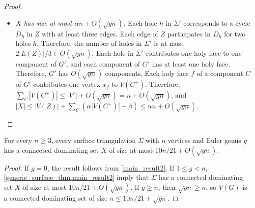 \documentclass{patmorin}
\begin{document}
\begin{proof}
\begin{itemize}
    Now consider the case when $v'$ and $w'$ lie in different components of $G'$.  Let $Q$ be any path in $G$ from $v$ to $w$. Partition the edges of $Q$ into maximal subpaths $Q_1,Q_2,\dots,Q_k$ such that each $Q_i$ corresponds to a path that is contained in some component $C_i$ of $G'$.  For each $i\in\{2,\ldots,k-1\}$, the subpath $Q_i$ has endpoints $v_i,w_i\in V(Z)\subseteq X$ and the component $C_i$ has corresponding vertices $v_i',w_i'\in Y_{C_i}$. The subpath $Q_1$ has endpoints $v_1:=v\in X$ corresponding to $v_1'\in V(C_1)$ and $w_1\in V(Z)\subseteq X$ corresponding to $w_1'\in Y_{C_1}$.  Since $v_1\in X$, $v_1'\in X_{C_1}\cup Y_{C_1}$.  The subpath $Q_k$ has endpoints $v_k\in V(Z)$ corresponding to $v_k'\in Y_{C_k}$ and $w_k:=w\in X$ corresponding to $w_k'\in V(C_k)$.  Since $w_k\in X$, $w_k'\in X_{C_k}\cup Y_{C_k}$. Thus, for each $i\in\{1,\ldots,k\}$, $H_{C_i}$ contains a path from $v_i'$ to $w_i'$, so $G_{C_i}\subseteq G[X]$ contains a path from $v_i$ to $w_i$.  Therefore, $G[X]$ contains a path from $v=v_1$ to $w=w_k$.

    \item \emph{$X$ has size at most $\alpha n + O(\sqrt{gn})$:} Each hole $h$ in $\Sigma'$ corresponds to a cycle $D_h$ in $Z$ with at least three edges. Each edge of $Z$ participates in $D_h$ for two holes $h$. Therefore, the number of holes in $\Sigma'$ is at most $2|E(Z)|/3\in O(\sqrt{gn})$. Each hole in $\Sigma'$ contributes one holy face to one component of $G'$, and each component of $G'$ has at least one holy face. Therefore, $G'$ has $O(\sqrt{gn})$ components.  Each holy face $f$ of a component $C$ of $G'$ contributes one vertex $x_f$ to $V(C^+)$. Therefore, $\sum_{C}|V(C^+)|\le |V'| + O(\sqrt{gn}) = n + O(\sqrt{gn})$, and $|X|\le |V(Z)| + \sum_{C} (\alpha|V(C^+)|+\beta)\le \alpha n + O(\sqrt{gn})$. \qedhere
\end{itemize}
\end{proof}

\begin{thm}\label{genus_result}
For every $n\ge 3$, every surface triangulation $\Sigma$ with $n$ vertices and Euler genus $g$ has a connected dominating set $X$ of size at most $10n/21 + O(\sqrt{gn})$.
\end{thm}
\begin{proof}
  If $g = 0$, the result follows from \cref{main_result2}. If $1 \le g < n$, \cref{generic_surface_thm,main_result2} imply that $\Sigma$ has a connected dominating set $X$ of size at most $10n/21 + O(\sqrt{gn})$. If $g \ge n$, then $\sqrt{gn}\ge n$, so $V(G)$ is a connected dominating set of size $n \le 10n/21 + \sqrt{gn}$.
\end{proof}
\end{document}
